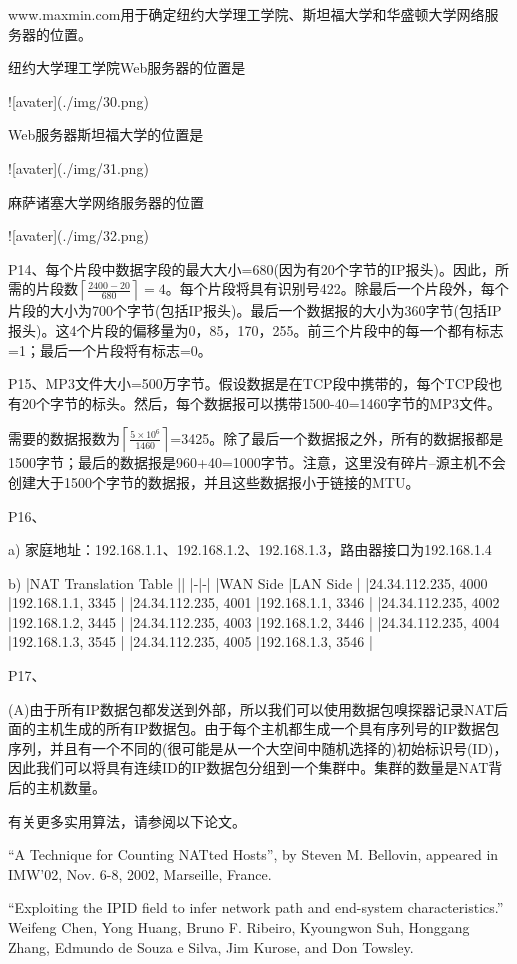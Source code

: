 \documentclass[11pt,UTF8,twoside]{article}
\begin{document}
	www.maxmin.com用于确定纽约大学理工学院、斯坦福大学和华盛顿大学网络服务器的位置。
	
	纽约大学理工学院Web服务器的位置是
	
	![avater](./img/30.png)
	
	Web服务器斯坦福大学的位置是
	
	![avater](./img/31.png)
	
	麻萨诸塞大学网络服务器的位置
	
	![avater](./img/32.png)
	
	P14、每个片段中数据字段的最大大小=680(因为有20个字节的IP报头)。因此，所需的片段数$\left \lceil \frac{2400-20}{680} \right \rceil =4$。每个片段将具有识别号422。除最后一个片段外，每个片段的大小为700个字节(包括IP报头)。最后一个数据报的大小为360字节(包括IP报头)。这4个片段的偏移量为0，85，170，255。前三个片段中的每一个都有标志=1；最后一个片段将有标志=0。
	
	P15、MP3文件大小=500万字节。假设数据是在TCP段中携带的，每个TCP段也有20个字节的标头。然后，每个数据报可以携带1500-40=1460字节的MP3文件。
	
	需要的数据报数为$\left \lceil 
	\frac{5 \times 10^6}{1460}
	\right \rceil$=3425。除了最后一个数据报之外，所有的数据报都是1500字节；最后的数据报是960+40=1000字节。注意，这里没有碎片--源主机不会创建大于1500个字节的数据报，并且这些数据报小于链接的MTU。
	
	P16、
	
	a) 家庭地址：192.168.1.1、192.168.1.2、192.168.1.3，路由器接口为192.168.1.4
	
	b) 
	|NAT Translation Table ||
	|-|-|
	|WAN Side |LAN Side |
	|24.34.112.235, 4000 |192.168.1.1, 3345 |
	|24.34.112.235, 4001 |192.168.1.1, 3346 |
	|24.34.112.235, 4002 |192.168.1.2, 3445 |
	|24.34.112.235, 4003 |192.168.1.2, 3446 |
	|24.34.112.235, 4004 |192.168.1.3, 3545 |
	|24.34.112.235, 4005 |192.168.1.3, 3546 |
	
	
	P17、
	
	(A)由于所有IP数据包都发送到外部，所以我们可以使用数据包嗅探器记录NAT后面的主机生成的所有IP数据包。由于每个主机都生成一个具有序列号的IP数据包序列，并且有一个不同的(很可能是从一个大空间中随机选择的)初始标识号(ID)，因此我们可以将具有连续ID的IP数据包分组到一个集群中。集群的数量是NAT背后的主机数量。
	
	有关更多实用算法，请参阅以下论文。
	
	“A Technique for Counting NATted Hosts”, by Steven M. Bellovin, appeared in 
	IMW’02, Nov. 6-8, 2002, Marseille, France. 
	
	“Exploiting the IPID field to infer network path and end-system characteristics.” 
	Weifeng Chen, Yong Huang, Bruno F. Ribeiro, Kyoungwon Suh, Honggang Zhang, 
	Edmundo de Souza e Silva, Jim Kurose, and Don Towsley. 
	
\end{document}
